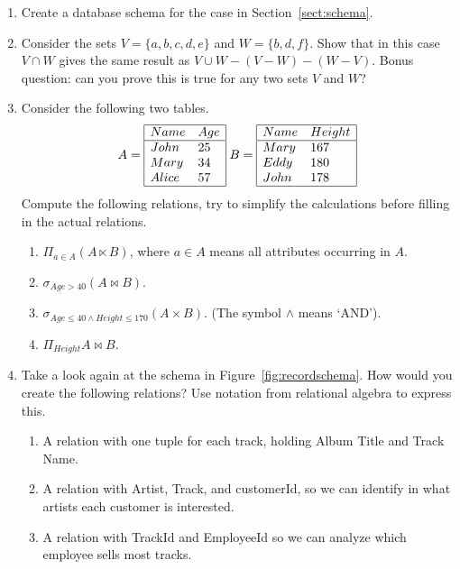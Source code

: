 \begin{enumerate}
\item Create a database schema for the case in Section~\ref{sect:schema}.
\item \label{ex:settheory} Consider the sets $V=\{a,b,c,d,e\}$ and
$W=\{b,d,f\}$.  Show that in this case $V\cap W$ gives the same result as $V\cup W- (V - W)
- (W - V)$. Bonus question: can you prove this is true for any two sets $V$ and $W$?
\item Consider the following two tables.
$$
A =
\begin{array}{|ll|}
\hline
Name & Age\\
\hline
John  & 25\\
Mary  & 34\\
Alice & 57\\
\hline
\end{array}
\;
B = 
\begin{array}{|ll|}
\hline
Name & Height\\
\hline
Mary & 167\\
Eddy & 180\\
John & 178\\
\hline
\end{array}
$$
\label{ex:schema}
Compute the following relations, try to simplify the calculations before
filling in the actual relations.
\begin{enumerate}
  \item $\Pi_{a\in A}(A\ltimes B)$, where $a\in A$ means all attributes occurring in $A$. 
  \item $\sigma_{Age>40} (A\bowtie B)$.
  \item $\sigma_{Age\leq40\land Height\leq 170} (A\times B)$. (The symbol $\land$ means `AND').
  \item $\Pi_{Height}A\bowtie B$.
\end{enumerate}
\item Take a look again at the schema in Figure~\ref{fig:recordschema}. How
would you create the following relations? Use notation from relational algebra
to express this.
\begin{enumerate}
  \item A relation with one tuple for each track, holding Album Title and Track Name.
  \item A relation with Artist, Track, and customerId, so we can identify in what artists
        each customer is interested.
  \item A relation with TrackId and EmployeeId so we can analyze which employee sells most tracks.
\end{enumerate}

\end{enumerate}

